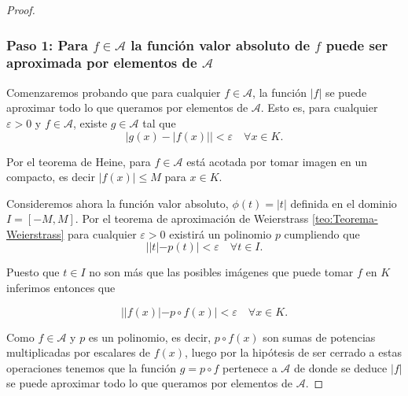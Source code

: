 \begin{proof}
    \subsubsection*{Paso 1: Para $f \in \mathcal{A}$ la función valor absoluto de $f$ puede ser aproximada por elementos
     de $\mathcal{A}$}
    Comenzaremos probando que para cualquier  $f \in \mathcal{A}$, 
    la función $|f|$ se puede aproximar todo lo que queramos por elementos de $\mathcal{A}$. 
    Esto es, 
    para cualquier $\varepsilon > 0$ y $f \in \mathcal{A}$, 
    existe $g \in \mathcal{A}$  tal que 
    \begin{equation*}
        |g(x) - |f(x)|| < \varepsilon \quad \forall x \in K.
    \end{equation*}

     Por el teorema de Heine, para $f \in \mathcal A$ está acotada por tomar imagen en un compacto, es decir $|f(x)| \leq M$ para $x \in K.$  

    Consideremos ahora la función valor absoluto, $\phi(t)=|t|$ definida en el dominio $I = [-M, M].$
    Por el teorema de aproximación de Weierstrass 
    \ref{teo:Teorema-Weierstrass}
    para cualquier $\varepsilon > 0$ 
    existirá un polinomio $p$ cumpliendo que 
    $$||t|- p(t)| < \varepsilon \quad \forall t \in I.$$

    Puesto que $t \in I$ no son más que las posibles imágenes que puede tomar $f$ en $K$ inferimos entonces que 

    $$||f(x)| - p \circ f(x)| < \varepsilon \quad \forall x \in K.$$

    Como $f \in \mathcal{A}$ y $p$ es un polinomio, es decir, 
     $p \circ f(x)$ son sumas de potencias multiplicadas por escalares de $f(x)$, luego por la hipótesis de ser cerrado a estas operaciones tenemos que la función 
    $g = p \circ f$ pertenece a $\mathcal{A}$ de donde se deduce  
    $|f|$ se puede aproximar todo lo que queramos por elementos de $\mathcal{A}$. 


\end{proof}
